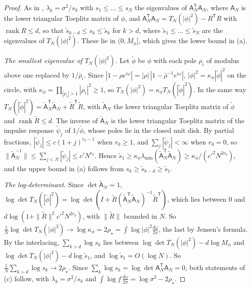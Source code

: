 \documentclass[11pt,onecolumn]{IEEEtran}
\newcommand{\dw}{\tfrac{d\omega}{2\pi}}
\begin{document}
\begin{proof}
As in \cite[proof of Lemma~25]{part3}, $\lambda_k=\sigma^2/s_k$ with
$s_1\le\dots\le s_N$ the eigenvalues of $\mathsf A_N^{\mathsf T}\mathsf A_N$,
where $\mathsf A_N$ is the lower triangular Toeplitz matrix of $\phi$, and
$\mathsf A_N^{\mathsf T}\mathsf A_N=T_N(|\phi|^2)-R^{\mathsf T}R$ with
$\operatorname{rank}R\le d$, so that $\tilde s_{k-d}\le s_k\le\tilde s_k$ for
$k>d$, where $\tilde s_1\le\dots\le\tilde s_N$ are the eigenvalues of
$T_N(|\phi|^2)$. These lie in $(0,M_\phi]$, which gives the lower bound
in (a).

\emph{The smallest eigenvalue of $T_N(|\phi|^2)$.} Let $\tilde\phi$ be
$\phi$ with each pole $\rho_i$ of modulus above one replaced by
$1/\bar\rho_i$. Since $|1-\rho e^{i\omega}|=|\rho|\,|1-\bar\rho^{-1}e^{i\omega}|$,
$|\phi|^2=\kappa_\phi|\tilde\phi|^2$ on the circle, with
$\kappa_\phi=\prod_{|\rho_i|>1}|\rho_i|^2\ge1$, so
$T_N(|\phi|^2)=\kappa_\phi T_N(|\tilde\phi|^2)$. In the same way
$T_N(|\tilde\phi|^2)=\tilde{\mathsf A}_N^{\mathsf T}\tilde{\mathsf A}_N+\tilde R^{\mathsf T}\tilde R$,
with $\tilde{\mathsf A}_N$ the lower triangular Toeplitz matrix of
$\tilde\phi$ and $\operatorname{rank}\tilde R\le d$. The inverse of
$\tilde{\mathsf A}_N$ is the lower triangular Toeplitz matrix of the impulse
response $\tilde\psi_j$ of $1/\tilde\phi$, whose poles lie in the closed
unit disk. By partial fractions, $|\tilde\psi_j|\le c(1+j)^{r_0-1}$ when
$r_0\ge1$, and $\sum_j|\tilde\psi_j|<\infty$ when $r_0=0$, so
$\|\tilde{\mathsf A}_N^{-1}\|\le\sum_{j<N}|\tilde\psi_j|\le c'N^{r_0}$. Hence
$\tilde s_1\ge\kappa_\phi\lambda_{\min}(\tilde{\mathsf A}_N^{\mathsf T}\tilde{\mathsf A}_N)\ge\kappa_\phi/(c'^2N^{2r_0})$,
and the upper bound in (a) follows from $s_k\ge\tilde s_{k-d}\ge\tilde s_1$.

\emph{The log-determinant.} Since $\det\tilde{\mathsf A}_N=1$,
$\log\det T_N(|\tilde\phi|^2)=\log\det(I+\tilde R(\tilde{\mathsf A}_N^{\mathsf T}\tilde{\mathsf A}_N)^{-1}\tilde R^{\mathsf T})$,
which lies between $0$ and $d\log(1+\|\tilde R\|^2c'^2N^{2r_0})$, with
$\|\tilde R\|$ bounded in $N$. So
$\tfrac1N\log\det T_N(|\phi|^2)\to\log\kappa_\phi=2\rho_\star=\int\log|\phi|^2\dw$,
the last by Jensen's formula. By the interlacing, $\sum_{k>d}\log s_k$
lies between $\log\det T_N(|\phi|^2)-d\log M_\phi$ and
$\log\det T_N(|\phi|^2)-d\log\tilde s_1$, and $\log\tilde s_1=O(\log N)$.
So $\tfrac1N\sum_{k>d}\log s_k\to2\rho_\star$. Since
$\sum_k\log s_k=\log\det\mathsf A_N^{\mathsf T}\mathsf A_N=0$, both statements of
(c) follow, with $\lambda_k=\sigma^2/s_k$ and
$\int\log f\,\dw=\log\sigma^2-2\rho_\star$.


\end{proof}
\end{document}
